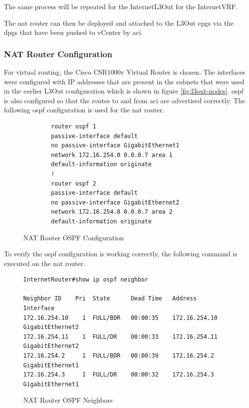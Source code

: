 The same process will be repeated for the InternetL3Out for the InternetVRF.

The \gls{nat} router can then be deployed and attached to the L3Out \gls{epg}s via the \gls{dpg}s that have been pushed to vCenter by \gls{aci}.

\subsubsection{NAT Router Configuration}

For virtual routing, the Cisco CSR1000v Virtual Router is chosen. The interfaces were configured with IP addresses that are present in the subnets that were used in the earlier L3Out configuration which is shown in figure \ref{fig:l3out-nodes}. \gls{ospf} is also configured so that the routes to and from \gls{aci} are advertised correctly. The following \gls{ospf} configuration is used for the \gls{nat} router.

\begin{figure}[H]
    \begin{verbatim}
        router ospf 1
        passive-interface default
        no passive-interface GigabitEthernet1
        network 172.16.254.0 0.0.0.7 area 1
        default-information originate
        !
        router ospf 2
        passive-interface default
        no passive-interface GigabitEthernet2
        network 172.16.254.8 0.0.0.7 area 2
        default-information originate
    \end{verbatim}
    \caption{NAT Router OSPF Configuration}
    \label{fig:nat-ospf}
\end{figure}

To verify the \gls{ospf} configuration is working correctly, the following command is executed on the \gls{nat} router.

\begin{figure}[H]
    \centering
    \begin{small}
        \begin{verbatim}
InternetRouter#show ip ospf neighbor

Neighbor ID    Pri  State      Dead Time   Address         Interface
172.16.254.10    1  FULL/BDR   00:00:35    172.16.254.10   GigabitEthernet2
172.16.254.11    1  FULL/DR    00:00:33    172.16.254.11   GigabitEthernet2
172.16.254.2     1  FULL/BDR   00:00:39    172.16.254.2    GigabitEthernet1
172.16.254.3     1  FULL/DR    00:00:32    172.16.254.3    GigabitEthernet1

    \end{verbatim}
    \end{small}
    \caption{NAT Router OSPF Neighbors}
    \label{fig:nat-ospf-db}
\end{figure}

